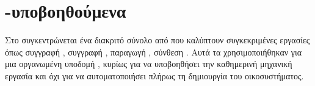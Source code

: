 \section{-υποβοηθούμενα }
\label{sec:appendix_ai_prompt_assets}

Στο \texttt{} συγκεντρώνεται ένα διακριτό σύνολο από 
που καλύπτουν συγκεκριμένες εργασίες όπως συγγραφή , συγγραφή ,
παραγωγή , σύνθεση .
Αυτά τα  χρησιμοποιήθηκαν για μια οργανωμένη υποδομή , κυρίως
για να υποβοηθήσει την καθημερινή μηχανική εργασία και όχι για να αυτοματοποιήσει πλήρως τη δημιουργία του οικοσυστήματος.

\begin{table}[H]
\centering
\caption{Καταγραφή  και βοηθητικών  μηχανικής υποστήριξης}
\label{tab:appendix_ai_helper_asset_inventory}

\end{table}
